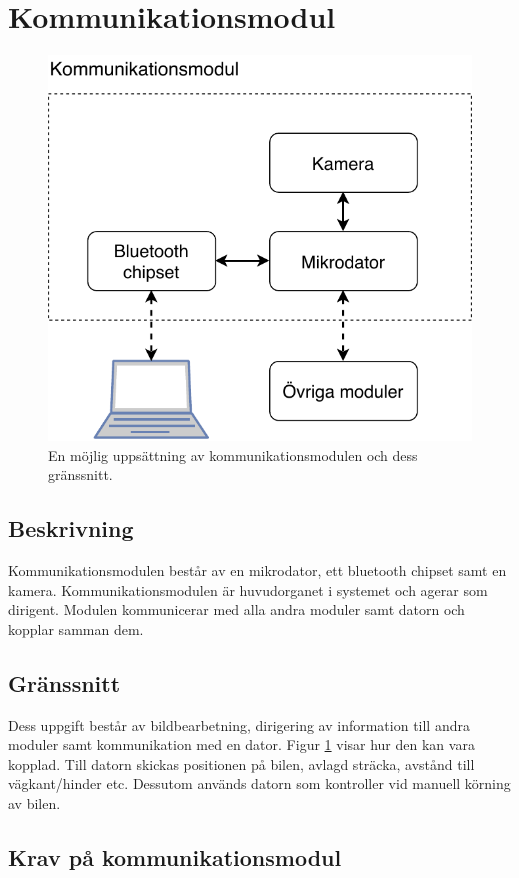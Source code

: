 \documentclass[kravspec/krav.tex]{subfiles}
\begin{document}
\clearpage
\section{Kommunikationsmodul}
\begin{figure}[H]
    \centering
    \includegraphics[height=0.4\linewidth]
        {kravspec/figures/kommunikationsmodul.pdf}
    \caption{En möjlig uppsättning av kommunikationsmodulen och dess
    gränssnitt.}
    \label{fig:kommunikationsmodul}
\end{figure}

\subsection{Beskrivning}
Kommunikationsmodulen består av en mikrodator, ett bluetooth chipset samt en
kamera. Kommunikationsmodulen är huvudorganet i systemet och agerar som
dirigent. Modulen kommunicerar med alla andra moduler samt datorn och kopplar
samman dem.

\subsection{Gränssnitt}
Dess uppgift består av bildbearbetning, dirigering av information till andra
moduler samt kommunikation med en dator. Figur \ref{fig:kommunikationsmodul}
visar hur den kan vara kopplad. Till datorn skickas positionen på bilen, avlagd
sträcka, avstånd till vägkant/hinder etc. Dessutom används datorn som
kontroller vid manuell körning av bilen.

\subsection{Krav på kommunikationsmodul}
\begin{reqlist}
\end{reqlist}

\clearpage
\end{document}
